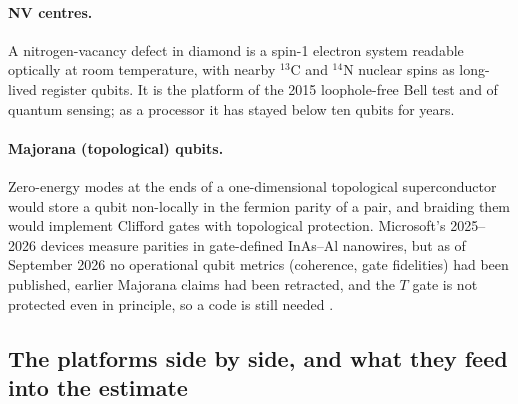 \paragraph{NV centres.} A nitrogen-vacancy defect in diamond is a spin-1 electron system
readable optically at room temperature, with nearby $^{13}$C and $^{14}$N nuclear spins as
long-lived register qubits. It is the platform of the 2015 loophole-free Bell test and of quantum
sensing; as a processor it has stayed below ten qubits for years.

\paragraph{Majorana (topological) qubits.} Zero-energy modes at the ends of a one-dimensional
topological superconductor would store a qubit non-locally in the fermion parity of a pair, and
braiding them would implement Clifford gates with topological protection. Microsoft's 2025--2026
devices measure parities in gate-defined InAs--Al nanowires, but as of September 2026 no operational
qubit metrics (coherence, gate fidelities) had been published, earlier Majorana claims had been
retracted, and the $T$ gate is not protected even in principle, so a code is still needed
\cite{ph:uqt26}.

\subsection{The platforms side by side, and what they feed into the estimate}\label{ph:sec:feeds}

